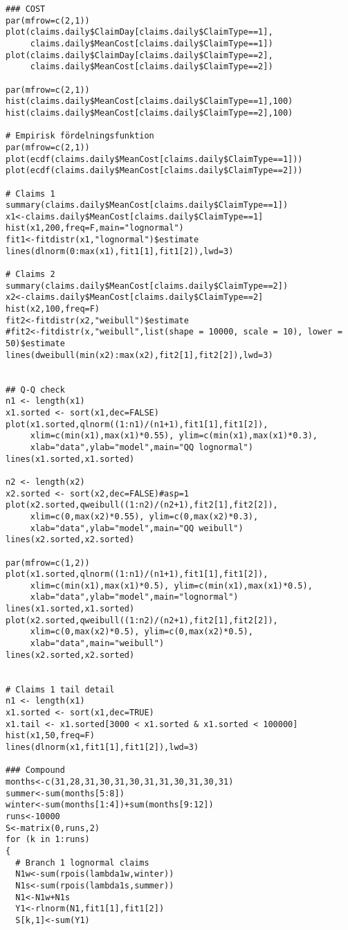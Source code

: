 \documentclass[11pt]{article}
\begin{document}
\begin{verbatim}
### COST
par(mfrow=c(2,1))
plot(claims.daily$ClaimDay[claims.daily$ClaimType==1],
     claims.daily$MeanCost[claims.daily$ClaimType==1])
plot(claims.daily$ClaimDay[claims.daily$ClaimType==2],
     claims.daily$MeanCost[claims.daily$ClaimType==2])

par(mfrow=c(2,1))
hist(claims.daily$MeanCost[claims.daily$ClaimType==1],100)
hist(claims.daily$MeanCost[claims.daily$ClaimType==2],100)

# Empirisk fördelningsfunktion
par(mfrow=c(2,1))
plot(ecdf(claims.daily$MeanCost[claims.daily$ClaimType==1]))
plot(ecdf(claims.daily$MeanCost[claims.daily$ClaimType==2]))

# Claims 1
summary(claims.daily$MeanCost[claims.daily$ClaimType==1])
x1<-claims.daily$MeanCost[claims.daily$ClaimType==1]
hist(x1,200,freq=F,main="lognormal")
fit1<-fitdistr(x1,"lognormal")$estimate
lines(dlnorm(0:max(x1),fit1[1],fit1[2]),lwd=3)

# Claims 2
summary(claims.daily$MeanCost[claims.daily$ClaimType==2])
x2<-claims.daily$MeanCost[claims.daily$ClaimType==2]
hist(x2,100,freq=F)
fit2<-fitdistr(x2,"weibull")$estimate
#fit2<-fitdistr(x,"weibull",list(shape = 10000, scale = 10), lower = 50)$estimate
lines(dweibull(min(x2):max(x2),fit2[1],fit2[2]),lwd=3)


## Q-Q check
n1 <- length(x1)
x1.sorted <- sort(x1,dec=FALSE)
plot(x1.sorted,qlnorm((1:n1)/(n1+1),fit1[1],fit1[2]),
     xlim=c(min(x1),max(x1)*0.55), ylim=c(min(x1),max(x1)*0.3),
     xlab="data",ylab="model",main="QQ lognormal")
lines(x1.sorted,x1.sorted)

n2 <- length(x2)
x2.sorted <- sort(x2,dec=FALSE)#asp=1
plot(x2.sorted,qweibull((1:n2)/(n2+1),fit2[1],fit2[2]),
     xlim=c(0,max(x2)*0.55), ylim=c(0,max(x2)*0.3),
     xlab="data",ylab="model",main="QQ weibull")
lines(x2.sorted,x2.sorted)

par(mfrow=c(1,2))
plot(x1.sorted,qlnorm((1:n1)/(n1+1),fit1[1],fit1[2]),
     xlim=c(min(x1),max(x1)*0.5), ylim=c(min(x1),max(x1)*0.5),
     xlab="data",ylab="model",main="lognormal")
lines(x1.sorted,x1.sorted)
plot(x2.sorted,qweibull((1:n2)/(n2+1),fit2[1],fit2[2]),
     xlim=c(0,max(x2)*0.5), ylim=c(0,max(x2)*0.5),
     xlab="data",main="weibull")
lines(x2.sorted,x2.sorted)


# Claims 1 tail detail
n1 <- length(x1)
x1.sorted <- sort(x1,dec=TRUE)
x1.tail <- x1.sorted[3000 < x1.sorted & x1.sorted < 100000]
hist(x1,50,freq=F)
lines(dlnorm(x1,fit1[1],fit1[2]),lwd=3)

### Compound
months<-c(31,28,31,30,31,30,31,31,30,31,30,31)
summer<-sum(months[5:8])
winter<-sum(months[1:4])+sum(months[9:12])
runs<-10000
S<-matrix(0,runs,2)
for (k in 1:runs)
{
  # Branch 1 lognormal claims
  N1w<-sum(rpois(lambda1w,winter))
  N1s<-sum(rpois(lambda1s,summer))
  N1<-N1w+N1s
  Y1<-rlnorm(N1,fit1[1],fit1[2])
  S[k,1]<-sum(Y1)
  

\end{verbatim}
\end{document}
